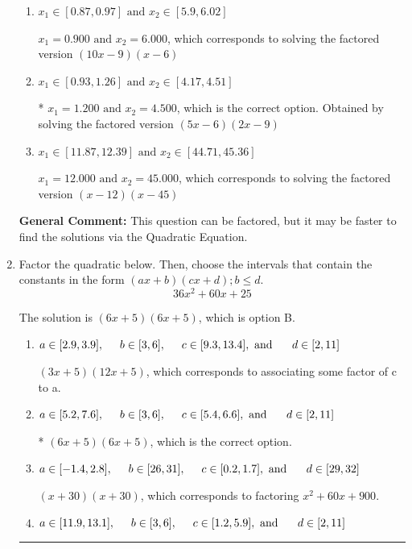 \documentclass{extbook}[14pt]
\newcommand{\litem}[1]{\item #1

\rule{\textwidth}{0.4pt}}
\begin{document}
\begin{enumerate}
{\begin{enumerate}[label=\Alph*.]
$x_1 = 1.500 \text{ and } x_2 = 3.600$, which corresponds to solving the factored version $(2x -3)(5x -18)$
\item \( x_1 \in [0.87, 0.97] \text{ and } x_2 \in [5.9, 6.02] \)

$x_1 = 0.900 \text{ and } x_2 = 6.000$, which corresponds to solving the factored version $(10x -9)(x -6)$
\item \( x_1 \in [0.93, 1.26] \text{ and } x_2 \in [4.17, 4.51] \)

* $x_1 = 1.200 \text{ and } x_2 = 4.500$, which is the correct option. Obtained by solving the factored version $(5x -6)(2x -9)$
\item \( x_1 \in [11.87, 12.39] \text{ and } x_2 \in [44.71, 45.36] \)

$x_1 = 12.000 \text{ and } x_2 = 45.000$, which corresponds to solving the factored version $(x -12)(x -45)$
\end{enumerate}

\textbf{General Comment:} This question can be factored, but it may be faster to find the solutions via the Quadratic Equation.
}
\litem{
Factor the quadratic below. Then, choose the intervals that contain the constants in the form $(ax+b)(cx+d); b \leq d.$
\[ 36x^{2} +60 x + 25 \]

The solution is \( (6x + 5)(6x + 5) \), which is option B.\begin{enumerate}[label=\Alph*.]
\item \( a \in [2.9, 3.9], \hspace*{5mm} b \in [3, 6], \hspace*{5mm} c \in [9.3, 13.4], \text{ and } \hspace*{5mm} d \in [2, 11] \)

 $(3x + 5)(12x + 5)$, which corresponds to associating some factor of c to a.
\item \( a \in [5.2, 7.6], \hspace*{5mm} b \in [3, 6], \hspace*{5mm} c \in [5.4, 6.6], \text{ and } \hspace*{5mm} d \in [2, 11] \)

* $(6x + 5)(6x + 5)$, which is the correct option.
\item \( a \in [-1.4, 2.8], \hspace*{5mm} b \in [26, 31], \hspace*{5mm} c \in [0.2, 1.7], \text{ and } \hspace*{5mm} d \in [29, 32] \)

 $(x + 30)(x + 30)$, which corresponds to factoring $x^{2} +60 x + 900$.
\item \( a \in [11.9, 13.1], \hspace*{5mm} b \in [3, 6], \hspace*{5mm} c \in [1.2, 5.9], \text{ and } \hspace*{5mm} d \in [2, 11] \)


\end{enumerate}}
\end{enumerate}
\end{document}
